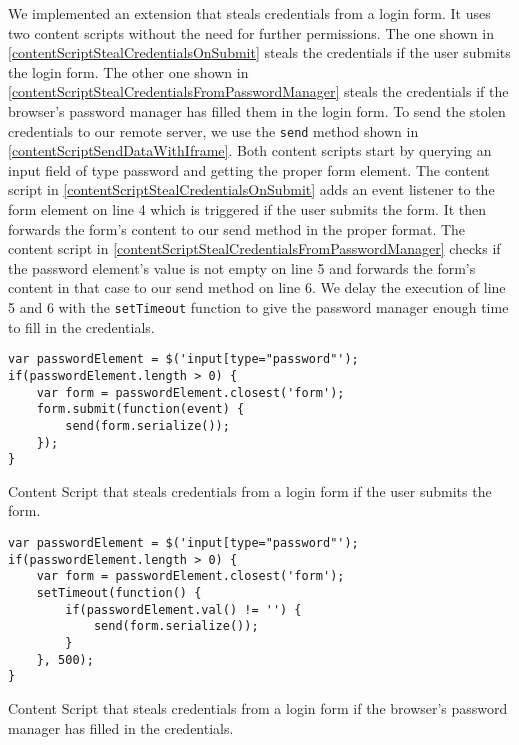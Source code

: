 			We implemented an extension that steals credentials from a login form. It uses two content scripts without the need for further permissions. The one shown in \autoref{contentScriptStealCredentialsOnSubmit} steals the credentials if the user submits the login form. The other one shown in \autoref{contentScriptStealCredentialsFromPasswordManager} steals the credentials if the browser's password manager has filled them in the login form. To send the stolen credentials to our remote server, we use the \texttt{send} method shown in \autoref{contentScriptSendDataWithIframe}. Both content scripts start by querying an input field of type password and getting the proper form element. The content script in \autoref{contentScriptStealCredentialsOnSubmit} adds an event listener to the form element on line 4 which is triggered if the user submits the form. It then forwards the form's content to our send method in the proper format. The content script in \autoref{contentScriptStealCredentialsFromPasswordManager} checks if the password element's value is not empty on line 5 and forwards the form's content in that case to our send method on line 6. We delay the execution of line 5 and 6 with the \texttt{setTimeout} function to give the password manager enough time to fill in the credentials. \\
					
			\begin{code}
				\begin{lstlisting}	
var passwordElement = $('input[type="password"');
if(passwordElement.length > 0) {
	var form = passwordElement.closest('form');
	form.submit(function(event) {
		send(form.serialize());
	});
}
\end{lstlisting}
				\caption{Content Script that steals credentials from a login form if the user submits the form.}
				\label{contentScriptStealCredentialsOnSubmit}
			\end{code}
		
			\begin{code}
				\begin{lstlisting}
var passwordElement = $('input[type="password"');
if(passwordElement.length > 0) {
	var form = passwordElement.closest('form');
	setTimeout(function() {
		if(passwordElement.val() != '') {
			send(form.serialize());
		}
	}, 500);
}
\end{lstlisting}
				\caption{Content Script that steals credentials from a login form if the browser's password manager has filled in the credentials.}
				\label{contentScriptStealCredentialsFromPasswordManager}
			\end{code}
		
